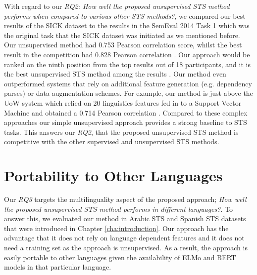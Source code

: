 \begin{enumerate}
With regard to our \textit{RQ2: How well the proposed unsupervised STS method performs when compared to various other STS methods?}, we compared our best results of the SICK dataset to the results in the SemEval 2014 Task 1 \cite{marelli-etal-2014-semeval} which was the original task that the SICK dataset was initiated as we mentioned before. Our unsupervised method had 0.753 Pearson correlation score, whilst the best result in the competition had 0.828 Pearson correlation \cite{marelli-etal-2014-semeval}. Our approach would be ranked on the ninth position from the top results out of 18 participants, and it is the best unsupervised STS method among the results \cite{marelli-etal-2014-semeval}. Our method even outperformed systems that rely on additional feature generation (e.g. dependency parses) or data augmentation schemes. For example, our method is just above the UoW system which relied on 20 linguistics features fed in to a Support Vector Machine and obtained a 0.714 Pearson correlation \cite{gupta-etal-2014-uow}. Compared to these complex approaches our simple unsupervised approach provides a strong baseline to STS tasks. This answers our \textit{RQ2}, that the proposed unsupervised STS method is competitive with the other supervised and unsupervised STS methods. 

\end{enumerate}


\section{Portability to Other Languages}
\label{sec:state_languages}
Our \textit{RQ3} targets the multilinguality aspect of the proposed approach; \textit{How well the proposed unsupervised STS method performs in different languages?}. To answer this, we evaluated our method in Arabic STS and Spanish STS datasets that were introduced in Chapter \ref{cha:introduction}. Our approach has the advantage that it does not rely on language dependent features and it does not need a training set as the approach is unsupervised. As a result, the approach is easily portable to other languages given the availability of ELMo and BERT models in that particular language. 

